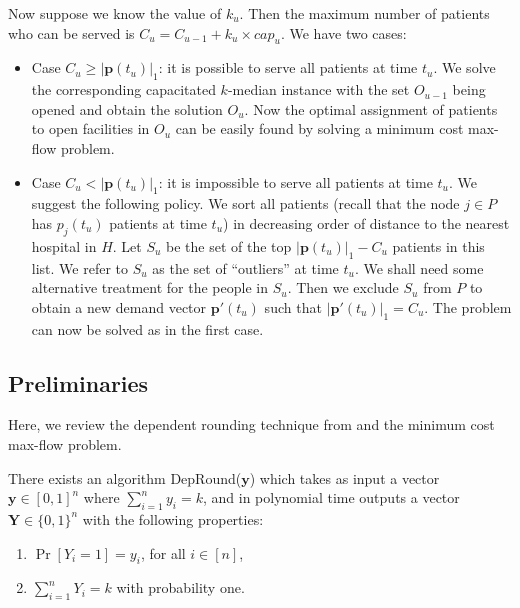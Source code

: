 Now suppose we know the value of $k_u$. Then the maximum number of patients who can be served is $C_u = C_{u-1} + k_u \times cap_u$. We have two cases:
\begin{itemize}
	\item Case $C_u \geq |\mathbf{p}(t_u)|_1$: it is possible to serve all patients at time $t_u$. We solve the corresponding capacitated $k$-median instance with the set $O_{u-1}$ being opened and obtain the solution $O_u$. Now the optimal assignment of patients to open facilities in $O_u$ can be easily found by solving a minimum cost max-flow problem.
	
	\item Case $C_u < |\mathbf{p}(t_u)|_1$: it is impossible to serve all patients at time $t_u$. We suggest the following policy. We sort all patients (recall that the node $j \in P$ has $p_j(t_u)$ patients at time $t_u$) in decreasing order of distance to the nearest hospital in $H$. Let $S_u$ be the set of the top $|\mathbf{p}(t_u)|_1 - C_u$ patients in this list. We refer to $S_u$ as the set of ``outliers'' at time $t_u$. We shall need some alternative treatment for the people in $S_u$. Then we exclude $S_u$ from $P$ to obtain a new demand vector $\mathbf{p}'(t_u)$ such that $|\mathbf{p}'(t_u)|_1 = C_u$. The problem can now be solved as in the first case.
	
\end{itemize}








\subsection{Preliminaries}
Here, we review the dependent rounding technique from \cite{srin:level-sets} and the minimum cost max-flow problem.

\begin{proposition}
\label{prop:dep-round}
There exists an algorithm {\sc DepRound}($\mathbf{y}$) which takes as input a vector $\mathbf{y} \in [0,1]^n$ where $\sum_{i=1}^n y_i = k$, and in polynomial time outputs a vector $\mathbf{Y} \in \{0,1\}^n$  with the following properties:
\begin{enumerate}
\item $\Pr[Y_i = 1] = y_i$, for all $i \in [n]$,
\item $\sum_{i=1}^n Y_i = k$ with probability one.
\end{enumerate}
\end{proposition} 

